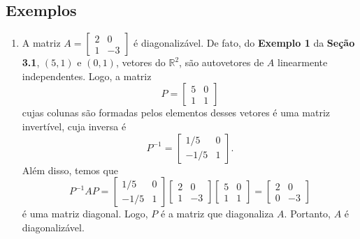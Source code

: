 \subsection{Exemplos}
\begin{enumerate}

\item  A matriz
$A= \begin{bmatrix}
2 & 0\\
 1& -3
\end{bmatrix}$ é diagonalizável.  De fato, do \textbf{Exemplo 1} da \textbf{Seção 3.1},
  $(5,1)$ e $(0,1)$, vetores do $\mathbb{R}^2$, são autovetores de $A$  linearmente independentes. Logo, a matriz $$P= \begin{bmatrix}
5 & 0\\
 1& 1
\end{bmatrix}$$ cujas colunas são formadas pelos elementos desses vetores é uma matriz invertível, cuja inversa é
$$P^{-1}= \begin{bmatrix}
1/5 & 0\\
 -1/5& 1
\end{bmatrix}.$$ Além disso,  temos que
$$P^{-1}AP=  \begin{bmatrix}
1/5 & 0\\
 -1/5& 1
\end{bmatrix}
\begin{bmatrix}
2 & 0\\
 1& -3
\end{bmatrix}
\begin{bmatrix}
5 & 0\\
 1& 1
\end{bmatrix}=
\begin{bmatrix}
2 & 0\\
 0& -3
\end{bmatrix}$$
é uma matriz diagonal.  Logo, $P$ é a matriz que   diagonaliza $A$.  Portanto, $A$ é diagonalizável.



\end{enumerate}


